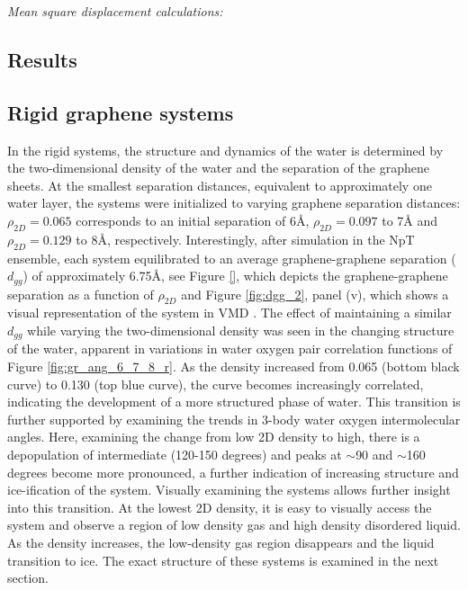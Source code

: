 \documentclass[12pt]{article}
\begin{document}
\textit{Mean square displacement calculations:} \\

\subsection*{Results}

\subsection*{Rigid graphene systems}

In the rigid systems, the structure and dynamics of the water is determined by the two-dimensional density of the water and the separation of the graphene sheets. At the smallest separation distances, equivalent to approximately one water layer, the systems were initialized to varying graphene separation distances: \(\rho_{2D} = 0.065\) corresponds to an initial separation of 6\r A, \(\rho_{2D} = 0.097\) to 7\r A and \(\rho_{2D} =0.129\) to 8\r A, respectively. Interestingly, after simulation in the NpT ensemble, each system equilibrated to an average graphene-graphene separation (\(d_{gg}\)) of approximately 6.75\r A, see Figure \ref{}, which depicts the graphene-graphene separation as a function of \(\rho_{2D}\) and Figure \ref{fig:dgg_2}, panel (v), which shows a visual representation of the system in VMD \cite{Humphrey1996}. The effect of maintaining a similar \(d_{gg}\) while varying the two-dimensional density was seen in the changing structure of the water, apparent in variations in water oxygen pair correlation functions of Figure \ref{fig:gr_ang_6_7_8_r}. As the density increased from 0.065 (bottom black curve) to 0.130 (top blue curve), the curve becomes increasingly correlated, indicating the development of a more structured phase of water. This transition is further supported by examining the trends in 3-body water oxygen intermolecular angles. Here, examining the change from low 2D density to high, there is a depopulation of intermediate (120-150 degrees) and peaks at \(\sim\)90 and \(\sim\)160 degrees become more pronounced, a further indication of increasing structure and ice-ification of the system. Visually examining the systems allows further insight into this transition. At the lowest 2D density, it is easy to visually access the system and observe a region of low density gas and high density disordered liquid. As the density increases, the low-density gas region disappears and the liquid transition to ice. The exact structure of these systems is examined in the next section.
\end{document}
